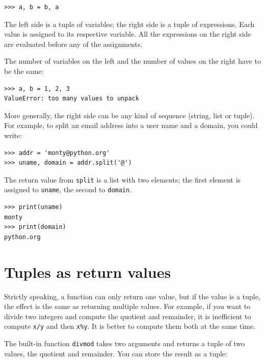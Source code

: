 \documentclass[10pt]{book}
\begin{document}
\beforeverb
\begin{verbatim}
>>> a, b = b, a
\end{verbatim}
\afterverb
%
The left side is a tuple of variables; the right side is a tuple of
expressions.  Each value is assigned to its respective variable.  
All the expressions on the right side are evaluated before any
of the assignments.

The number of variables on the left and the number of
values on the right have to be the same:


\beforeverb
\begin{verbatim}
>>> a, b = 1, 2, 3
ValueError: too many values to unpack
\end{verbatim}
\afterverb
%
More generally, the right side can be any kind of sequence
(string, list or tuple).  For example, to split an email address
into a user name and a domain, you could write:


\beforeverb
\begin{verbatim}
>>> addr = 'monty@python.org'
>>> uname, domain = addr.split('@')
\end{verbatim}
\afterverb
%
The return value from {\tt split} is a list with two elements;
the first element is assigned to {\tt uname}, the second to
{\tt domain}.

\beforeverb
\begin{verbatim}
>>> print(uname)
monty
>>> print(domain)
python.org
\end{verbatim}
\afterverb
%

\section{Tuples as return values}


Strictly speaking, a function can only return one value, but
if the value is a tuple, the effect is the same as returning
multiple values.  For example, if you want to divide two integers
and compute the quotient and remainder, it is inefficient to
compute {\tt x/y} and then {\tt x\%y}.  It is better to compute
them both at the same time.


The built-in function {\tt divmod} takes two arguments and
returns a tuple of two values, the quotient and remainder.
You can store the result as a tuple:
\end{document}

